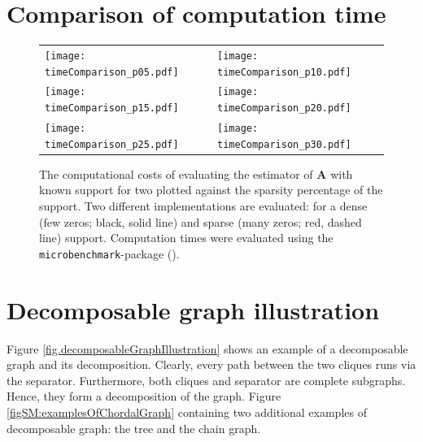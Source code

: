 \newpage
\section{Comparison of computation time}
\begin{figure}[h!]
\centering
\begin{tabular}{ll}
\texttt{[image: timeComparison\_p05.pdf]} &
\texttt{[image: timeComparison\_p10.pdf]}
\\
\texttt{[image: timeComparison\_p15.pdf]} &
\texttt{[image: timeComparison\_p20.pdf]}
\\
\texttt{[image: timeComparison\_p25.pdf]} &
\texttt{[image: timeComparison\_p30.pdf]}
\end{tabular}
\caption{The computational costs of evaluating the estimator of $\mathbf{A}$ with known support for two plotted against the sparsity percentage of the support. Two different implementations are evaluated: for a dense (few zeros; black, solid line) and sparse (many zeros; red, dashed line) support. Computation times were evaluated using the {\tt microbenchmark}-package (\cite{Mersmann2014}). }
\label{figSM:timeComparison}
\end{figure}




\newpage
\section{Decomposable graph illustration}
Figure \ref{fig.decomposableGraphIllustration} shows an example of a decomposable graph and its decomposition. Clearly, every path between the two cliques runs via the separator. Furthermore, both cliques and separator are complete subgraphs. Hence, they form a decomposition of the graph. Figure \ref{figSM:examplesOfChordalGraph} containing two additional examples of decomposable graph: the tree and the chain graph.

